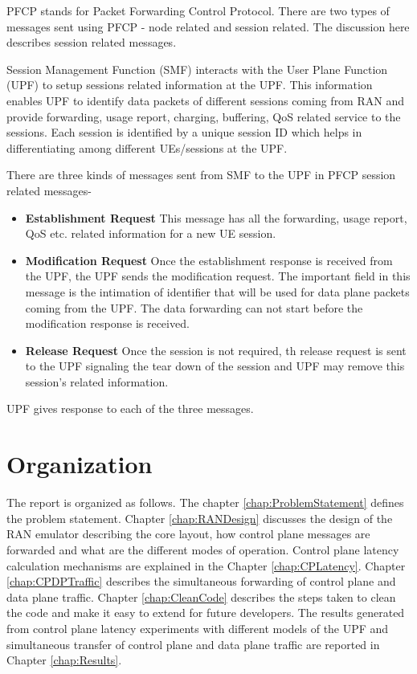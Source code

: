 PFCP stands for Packet Forwarding Control Protocol. 
 There are two types of messages sent using PFCP - node related and session related.
 The discussion here describes session related messages.

 Session Management Function (SMF) interacts with the User Plane Function (UPF) to setup sessions related 
 information at the UPF.
This  information enables UPF to identify data packets of different sessions coming from RAN 
and provide forwarding, usage report, charging, buffering, QoS related service to the sessions.
Each session is identified by a unique session ID which helps in differentiating 
among different UEs/sessions at the UPF. 

There are three kinds of messages sent from SMF to the UPF in PFCP session related messages-
\begin{itemize}
	\item \textbf{Establishment Request} This message has all the forwarding, usage report, QoS etc. related information for  a new UE session.  
	\item \textbf{Modification Request} Once the establishment response is
	received from the UPF, the UPF sends the modification request. The important field in this message is the intimation of identifier that will be used for data plane packets coming from the UPF. The data forwarding can not start before the modification response is received.
	\item \textbf{Release Request} Once the session is not required, th release 
	request is sent to the UPF signaling the tear down of the session and UPF
	 may remove this session's related information.
\end{itemize}
UPF gives response to each of the three messages. 

\section {Organization \label{sec:Organization}}

The report is organized as follows.
The chapter \ref{chap:ProblemStatement} defines the problem statement. Chapter 
\ref{chap:RANDesign} discusses the  design of the RAN emulator describing the core
 layout, how control plane messages are forwarded and what are the different modes
  of operation. Control plane latency calculation mechanisms are explained in  the
   Chapter \ref{chap:CPLatency}. Chapter \ref{chap:CPDPTraffic} describes the
    simultaneous forwarding of control plane and data plane traffic. Chapter 
    \ref{chap:CleanCode}  describes the steps taken to clean the code and make it easy to extend for future developers. 
    The results generated from control plane latency experiments with different models of the UPF and simultaneous transfer of control plane and data plane traffic are reported in Chapter \ref{chap:Results}.